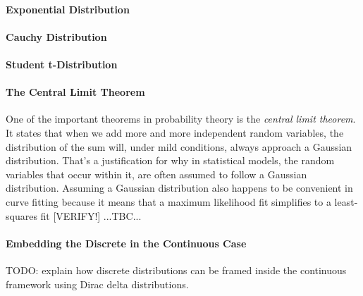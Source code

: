 






\paragraph{Exponential Distribution}

\paragraph{Cauchy Distribution}

\paragraph{Student t-Distribution}


\paragraph{The Central Limit Theorem}
One of the important theorems in probability theory is the \emph{central limit theorem}. It states that when we add more and more independent random variables, the distribution of the sum will, under mild conditions, always approach a Gaussian distribution. That's a justification for why in statistical models, the random variables that occur within it, are often assumed to follow a Gaussian distribution. Assuming a Gaussian distribution also happens to be convenient in curve fitting because it means that a maximum likelihood fit simplifies to a least-squares fit [VERIFY!] ...TBC...


\paragraph{Embedding the Discrete in the Continuous Case}
TODO: explain how discrete distributions can be framed inside the continuous framework using Dirac delta distributions. 

